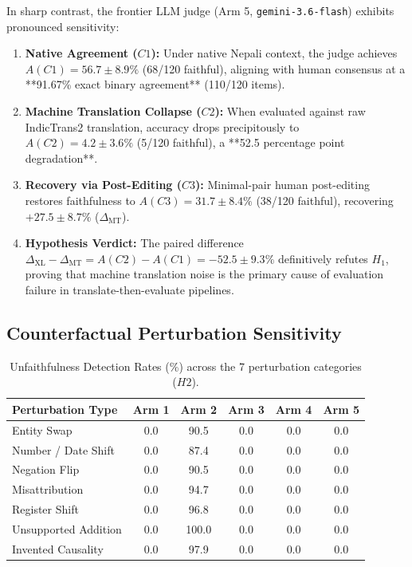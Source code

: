 \documentclass[conference]{IEEEtran}
\begin{document}
In sharp contrast, the frontier LLM judge (Arm 5, \texttt{gemini-3.6-flash}) exhibits pronounced sensitivity:
\begin{enumerate}
    \item \textbf{Native Agreement ($C1$):} Under native Nepali context, the judge achieves $A(C1) = 56.7 \pm 8.9\%$ (68/120 faithful), aligning with human consensus at a **91.67\% exact binary agreement** (110/120 items).
    \item \textbf{Machine Translation Collapse ($C2$):} When evaluated against raw IndicTrans2 translation, accuracy drops precipitously to $A(C2) = 4.2 \pm 3.6\%$ (5/120 faithful), a **52.5 percentage point degradation**.
    \item \textbf{Recovery via Post-Editing ($C3$):} Minimal-pair human post-editing restores faithfulness to $A(C3) = 31.7 \pm 8.4\%$ (38/120 faithful), recovering $+27.5 \pm 8.7\%$ ($\Delta_{\text{MT}}$).
    \item \textbf{Hypothesis Verdict:} The paired difference $\Delta_{\text{XL}} - \Delta_{\text{MT}} = A(C2) - A(C1) = \mathbf{-52.5 \pm 9.3\%}$ definitively refutes $H_1$, proving that machine translation noise is the primary cause of evaluation failure in translate-then-evaluate pipelines.
\end{enumerate}

\subsection{Counterfactual Perturbation Sensitivity}

\begin{table}[t]
\centering
\small
\begin{tabular}{lccccc}
\toprule
\textbf{Perturbation Type} & \textbf{Arm 1} & \textbf{Arm 2} & \textbf{Arm 3} & \textbf{Arm 4} & \textbf{Arm 5} \\
\midrule
Entity Swap & 0.0 & 90.5 & 0.0 & 0.0 & 0.0 \\
Number / Date Shift & 0.0 & 87.4 & 0.0 & 0.0 & 0.0 \\
Negation Flip & 0.0 & 90.5 & 0.0 & 0.0 & 0.0 \\
Misattribution & 0.0 & 94.7 & 0.0 & 0.0 & 0.0 \\
Register Shift & 0.0 & 96.8 & 0.0 & 0.0 & 0.0 \\
Unsupported Addition & 0.0 & 100.0 & 0.0 & 0.0 & 0.0 \\
Invented Causality & 0.0 & 97.9 & 0.0 & 0.0 & 0.0 \\
\bottomrule
\end{tabular}
\caption{Unfaithfulness Detection Rates (\%) across the 7 perturbation categories ($H2$).}
\label{tab:perturbation_matrix}
\end{table}
\end{document}
